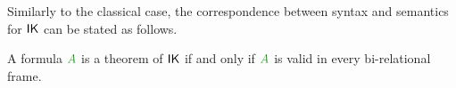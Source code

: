 %

Similarly to the classical case, the correspondence between syntax and semantics for $\mathsf{IK}$ can be stated as follows.

\begin{theorem}\label{thm:plotkin}
	A formula $\fm A$ is a theorem of $\mathsf{IK}$ if and only if $\fm A$ is valid in every bi-relational frame.
\end{theorem}


